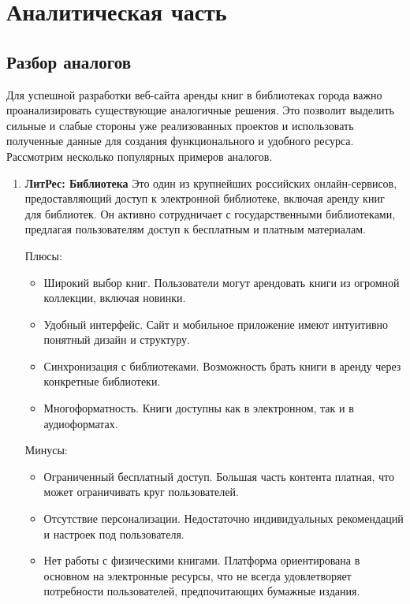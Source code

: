 \chapter{Аналитическая часть}

\section{Разбор аналогов}

Для успешной разработки веб-сайта аренды книг в библиотеках города важно проанализировать существующие аналогичные решения. Это позволит выделить сильные и слабые стороны уже реализованных проектов и использовать полученные данные для создания функционального и удобного ресурса. Рассмотрим несколько популярных примеров аналогов.

\begin{enumerate}
  \item \textbf{ЛитРес: Библиотека}
  Это один из крупнейших российских онлайн-сервисов, предоставляющий доступ к электронной библиотеке, включая аренду книг для библиотек. Он активно сотрудничает с государственными библиотеками, предлагая пользователям доступ к бесплатным и платным материалам.

  Плюсы:
  \begin{itemize}
    \item Широкий выбор книг. Пользователи могут арендовать книги из огромной коллекции, включая новинки.
    \item Удобный интерфейс. Сайт и мобильное приложение имеют интуитивно понятный дизайн и структуру.
    \item Синхронизация с библиотеками. Возможность брать книги в аренду через конкретные библиотеки.
    \item Многоформатность. Книги доступны как в электронном, так и в аудиоформатах.
  \end{itemize}

  Минусы:
  \begin{itemize}
    \item Ограниченный бесплатный доступ. Большая часть контента платная, что может ограничивать круг пользователей.
    \item Отсутствие персонализации. Недостаточно индивидуальных рекомендаций и настроек под пользователя.
    \item Нет работы с физическими книгами. Платформа ориентирована в основном на электронные ресурсы, что не всегда удовлетворяет потребности пользователей, предпочитающих бумажные издания.
  \end{itemize}


\end{enumerate}
